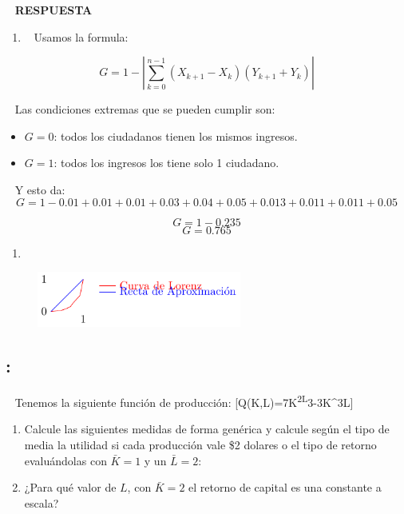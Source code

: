 \documentclass[
  letterpaper,
  DIV=11,
  numbers=noendperiod]{scrreport}
\providecommand{\tightlist}{%
  \setlength{\itemsep}{0pt}\setlength{\parskip}{0pt}}\usepackage{longtable,booktabs,array}
\begin{document}
~ \textbf{RESPUESTA}

\begin{enumerate}
\def\labelenumi{\arabic{enumi})}
\tightlist
\item
  ~ Usamos la formula:
\end{enumerate}

\[
G=1-\left|\sum_{k=0}^{n-1}\left(X_{k+1}-X_k\right)\left(Y_{k+1}+Y_k\right)\right|
\]

~ Las condiciones extremas que se pueden cumplir son:

\begin{itemize}
\item
  \(G=0\): todos los ciudadanos tienen los mismos ingresos.
\item
  \(G=1\): todos los ingresos los tiene solo 1 ciudadano.
\end{itemize}

~ Y esto da: \[
G=1-0.01+0.01+0.01+0.03+0.04+0.05+0.013+0.011+0.011+0.05
\]

\[
G=1-0.235
\] \[
G=0.765
\]

\begin{enumerate}
\def\labelenumi{\arabic{enumi})}
\setcounter{enumi}{1}
\tightlist
\item
\end{enumerate}

\begin{figure}

{\centering \includegraphics[width=0.6\textwidth,height=\textheight]{8ej_pauta_files/figure-pdf/unnamed-chunk-16-1.pdf}

}

\end{figure}

\hypertarget{section-40}{%
\subsection{:}\label{section-40}}

~ Tenemos la siguiente función de producción:
{[}Q(K,L)=7K\textsuperscript{2L}3-3K\^{}3L{]}

\begin{enumerate}
\def\labelenumi{\arabic{enumi})}
\item
  Calcule las siguientes medidas de forma genérica y calcule según el
  tipo de media la utilidad si cada producción vale \$2 dolares o el
  tipo de retorno evaluándolas con \(\bar{K}=1\) y un \(\bar{L}=2\):
\item
  ¿Para qué valor de \(L\), con \(\bar{K}=2\) el retorno de capital es
  una constante a escala?
\end{enumerate}
\end{document}
